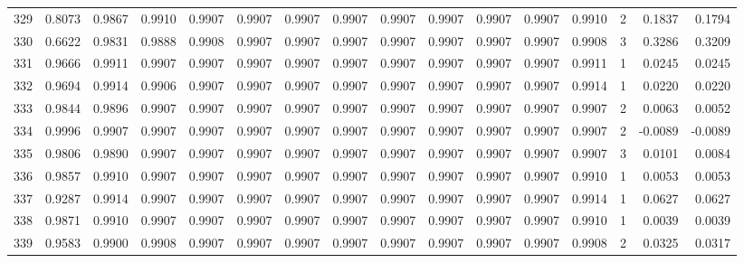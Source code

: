 \begin{tabular}{lrrrrrrrrrrrrrrr}
329 &      0.8073 &  0.9867 &  0.9910 &  0.9907 &  0.9907 &  0.9907 &  0.9907 &  0.9907 &  0.9907 &  0.9907 &   0.9907 &     0.9910 &      2 &                    0.1837 &                     0.1794 \\
330 &      0.6622 &  0.9831 &  0.9888 &  0.9908 &  0.9907 &  0.9907 &  0.9907 &  0.9907 &  0.9907 &  0.9907 &   0.9907 &     0.9908 &      3 &                    0.3286 &                     0.3209 \\
331 &      0.9666 &  0.9911 &  0.9907 &  0.9907 &  0.9907 &  0.9907 &  0.9907 &  0.9907 &  0.9907 &  0.9907 &   0.9907 &     0.9911 &      1 &                    0.0245 &                     0.0245 \\
332 &      0.9694 &  0.9914 &  0.9906 &  0.9907 &  0.9907 &  0.9907 &  0.9907 &  0.9907 &  0.9907 &  0.9907 &   0.9907 &     0.9914 &      1 &                    0.0220 &                     0.0220 \\
333 &      0.9844 &  0.9896 &  0.9907 &  0.9907 &  0.9907 &  0.9907 &  0.9907 &  0.9907 &  0.9907 &  0.9907 &   0.9907 &     0.9907 &      2 &                    0.0063 &                     0.0052 \\
334 &      0.9996 &  0.9907 &  0.9907 &  0.9907 &  0.9907 &  0.9907 &  0.9907 &  0.9907 &  0.9907 &  0.9907 &   0.9907 &     0.9907 &      2 &                   -0.0089 &                    -0.0089 \\
335 &      0.9806 &  0.9890 &  0.9907 &  0.9907 &  0.9907 &  0.9907 &  0.9907 &  0.9907 &  0.9907 &  0.9907 &   0.9907 &     0.9907 &      3 &                    0.0101 &                     0.0084 \\
336 &      0.9857 &  0.9910 &  0.9907 &  0.9907 &  0.9907 &  0.9907 &  0.9907 &  0.9907 &  0.9907 &  0.9907 &   0.9907 &     0.9910 &      1 &                    0.0053 &                     0.0053 \\
337 &      0.9287 &  0.9914 &  0.9907 &  0.9907 &  0.9907 &  0.9907 &  0.9907 &  0.9907 &  0.9907 &  0.9907 &   0.9907 &     0.9914 &      1 &                    0.0627 &                     0.0627 \\
338 &      0.9871 &  0.9910 &  0.9907 &  0.9907 &  0.9907 &  0.9907 &  0.9907 &  0.9907 &  0.9907 &  0.9907 &   0.9907 &     0.9910 &      1 &                    0.0039 &                     0.0039 \\
339 &      0.9583 &  0.9900 &  0.9908 &  0.9907 &  0.9907 &  0.9907 &  0.9907 &  0.9907 &  0.9907 &  0.9907 &   0.9907 &     0.9908 &      2 &                    0.0325 &                     0.0317 \\

\end{tabular}
